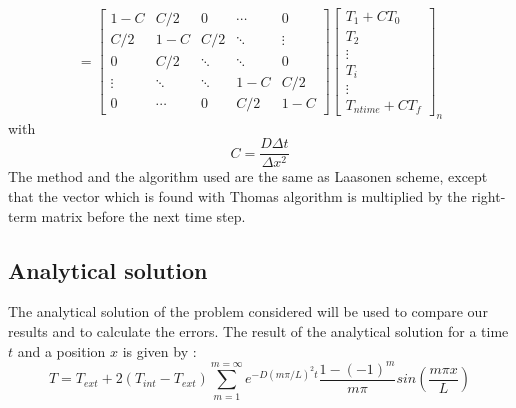 \documentclass{article}
\begin{document}
                        \[
                            =
                            \begin{bmatrix}
                                1-C    &C/2    & 0      & \cdots & 0 \\
                                C/2     & 1-C   & C/2     & \ddots & \vdots \\
                                0      & C/2     & \ddots & \ddots & 0 \\
                                \vdots & \ddots & \ddots & 1-C   & C/2\\
                                0      & \cdots & 0      & C/2     & 1-C
                            \end{bmatrix}
                            \begin{bmatrix}
                                T_{1} + CT_{0}\\
                                T_{2} \\
                                \vdots \\
                                T_{i} \\
                                \vdots \\
                                T_{ntime} + CT_{f}
                            \end{bmatrix}_{n}
                        \]
                        with $$C = \frac{D\Delta t}{\Delta x ^2}  $$ 
                        The method and the algorithm used are the same as Laasonen scheme, except that the vector which is found with Thomas algorithm
                        is multiplied by the right-term matrix before the next time step.
    
                \subsection{Analytical solution}
                    The analytical solution of the problem considered will be used to compare our results and to calculate
                the errors. The result of the analytical solution for a time $t$ and a position $x$ is given by : 
                \begin{equation}
                    \label{eq:analytical}
                    T = T_{ext}+2(T_{int}-T_{ext})\sum_{m=1}^{m=\infty} e^{-D(m\pi / L)^{2}t} \frac{1-(-1)^m}{m\pi} sin(\frac{m\pi x}{L})
                \end{equation}
\end{document}
